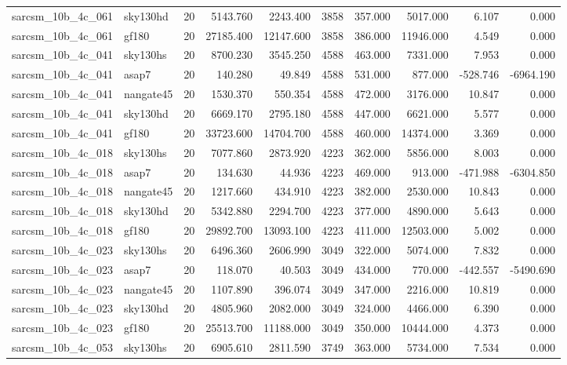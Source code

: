 \begin{tabular}{llrrrrrrrr}
sarcsm\_10b\_4c\_061 & sky130hd & 20 & 5143.760 & 2243.400 & 3858 & 357.000 & 5017.000 & 6.107 & 0.000 \\
sarcsm\_10b\_4c\_061 & gf180 & 20 & 27185.400 & 12147.600 & 3858 & 386.000 & 11946.000 & 4.549 & 0.000 \\
sarcsm\_10b\_4c\_041 & sky130hs & 20 & 8700.230 & 3545.250 & 4588 & 463.000 & 7331.000 & 7.953 & 0.000 \\
sarcsm\_10b\_4c\_041 & asap7 & 20 & 140.280 & 49.849 & 4588 & 531.000 & 877.000 & -528.746 & -6964.190 \\
sarcsm\_10b\_4c\_041 & nangate45 & 20 & 1530.370 & 550.354 & 4588 & 472.000 & 3176.000 & 10.847 & 0.000 \\
sarcsm\_10b\_4c\_041 & sky130hd & 20 & 6669.170 & 2795.180 & 4588 & 447.000 & 6621.000 & 5.577 & 0.000 \\
sarcsm\_10b\_4c\_041 & gf180 & 20 & 33723.600 & 14704.700 & 4588 & 460.000 & 14374.000 & 3.369 & 0.000 \\
sarcsm\_10b\_4c\_018 & sky130hs & 20 & 7077.860 & 2873.920 & 4223 & 362.000 & 5856.000 & 8.003 & 0.000 \\
sarcsm\_10b\_4c\_018 & asap7 & 20 & 134.630 & 44.936 & 4223 & 469.000 & 913.000 & -471.988 & -6304.850 \\
sarcsm\_10b\_4c\_018 & nangate45 & 20 & 1217.660 & 434.910 & 4223 & 382.000 & 2530.000 & 10.843 & 0.000 \\
sarcsm\_10b\_4c\_018 & sky130hd & 20 & 5342.880 & 2294.700 & 4223 & 377.000 & 4890.000 & 5.643 & 0.000 \\
sarcsm\_10b\_4c\_018 & gf180 & 20 & 29892.700 & 13093.100 & 4223 & 411.000 & 12503.000 & 5.002 & 0.000 \\
sarcsm\_10b\_4c\_023 & sky130hs & 20 & 6496.360 & 2606.990 & 3049 & 322.000 & 5074.000 & 7.832 & 0.000 \\
sarcsm\_10b\_4c\_023 & asap7 & 20 & 118.070 & 40.503 & 3049 & 434.000 & 770.000 & -442.557 & -5490.690 \\
sarcsm\_10b\_4c\_023 & nangate45 & 20 & 1107.890 & 396.074 & 3049 & 347.000 & 2216.000 & 10.819 & 0.000 \\
sarcsm\_10b\_4c\_023 & sky130hd & 20 & 4805.960 & 2082.000 & 3049 & 324.000 & 4466.000 & 6.390 & 0.000 \\
sarcsm\_10b\_4c\_023 & gf180 & 20 & 25513.700 & 11188.000 & 3049 & 350.000 & 10444.000 & 4.373 & 0.000 \\
sarcsm\_10b\_4c\_053 & sky130hs & 20 & 6905.610 & 2811.590 & 3749 & 363.000 & 5734.000 & 7.534 & 0.000 \\

\end{tabular}
